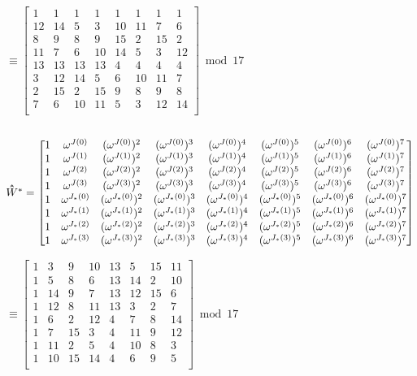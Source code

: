 $ \equiv \begin{bmatrix}
1 & 1 & 1 & 1 & 1 & 1 & 1 & 1\\
12&14&5&3&10&11&7&6\\
8&9&8&9&15&2&15&2\\
11&7&6&10&14&5&3&12\\
13&13&13&13&4&4&4&4\\
3&12&14&5&6&10&11&7\\
2&15&2&15&9&8&9&8\\
7&6&10&11&5&3&12&14\\
\end{bmatrix} \bmod{17}$ 

$ $ 

$\hathat{W}^* = \begin{bmatrix}
1 & \omega^{J(0)} & (\omega^{J(0)})^2 & (\omega^{J(0)})^3 & (\omega^{J(0)})^4 & (\omega^{J(0)})^5 & (\omega^{J(0)})^6 & (\omega^{J(0)})^7\\
1 & \omega^{J(1)} & (\omega^{J(1)})^2 & (\omega^{J(1)})^3 & (\omega^{J(1)})^4& (\omega^{J(1)})^5& (\omega^{J(1)})^6& (\omega^{J(1)})^7\\
1 & \omega^{J(2)} & (\omega^{J(2)})^2 & (\omega^{J(2)})^3 & (\omega^{J(2)})^4 & (\omega^{J(2)})^5 & (\omega^{J(2)})^6 & (\omega^{J(2)})^7\\
1 & \omega^{J(3)} & (\omega^{J(3)})^2 & (\omega^{J(3)})^3 & (\omega^{J(3)})^4& (\omega^{J(3)})^5& (\omega^{J(3)})^6& (\omega^{J(3)})^7\\
1 & \omega^{J_*(0)} & (\omega^{J_*(0)})^2 & (\omega^{J_*(0)})^3 & (\omega^{J_*(0)})^4 & (\omega^{J_*(0)})^5 & (\omega^{J_*(0)})^6 & (\omega^{J_*(0)})^7\\
1 & \omega^{J_*(1)} & (\omega^{J_*(1)})^2 & (\omega^{J_*(1)})^3 & (\omega^{J_*(1)})^4& (\omega^{J_*(1)})^5& (\omega^{J_*(1)})^6& (\omega^{J_*(1)})^7\\
1 & \omega^{J_*(2)} & (\omega^{J_*(2)})^2 & (\omega^{J_*(2)})^3 & (\omega^{J_*(2)})^4 & (\omega^{J_*(2)})^5 & (\omega^{J_*(2)})^6 & (\omega^{J_*(2)})^7\\
1 & \omega^{J_*(3)} & (\omega^{J_*(3)})^2 & (\omega^{J_*(3)})^3 & (\omega^{J_*(3)})^4& (\omega^{J_*(3)})^5& (\omega^{J_*(3)})^6& (\omega^{J_*(3)})^7\\
\end{bmatrix}$

$ \equiv \begin{bmatrix}
1&3&9&10&13&5&15&11\\
1&5&8&6&13&14&2&10\\
1&14&9&7&13&12&15&6\\
1&12&8&11&13&3&2&7\\
1&6&2&12&4&7&8&14\\
1&7&15&3&4&11&9&12\\
1&11&2&5&4&10&8&3\\
1&10&15&14&4&6&9&5\\
\end{bmatrix}  \bmod{17}$

